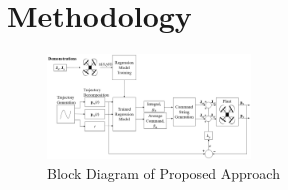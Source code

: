 \documentclass[letterpaper, 10 pt, conference]{ieeeconf}  %
\newcommand\NB[1]{$\spadesuit$\footnote{NB: #1}}
\begin{document}

\section{Methodology} \label{sec:approach}

\begin{figure}[ht]
    \includegraphics[width=0.48\textwidth]{images/blocks.PNG}
    \caption{Block Diagram of Proposed Approach}
    \label{fig:blockdiagram}
\end{figure}
\end{document}
